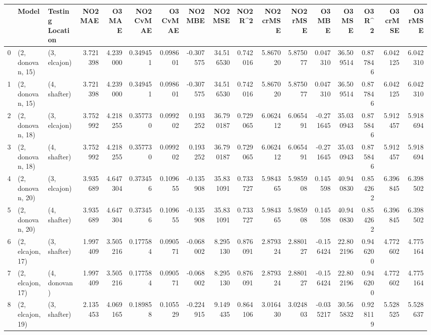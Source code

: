 \begin{tabular}{lllrrrrrrrrrrrrrr}
\toprule
{} &             Model & Testing Location &   NO2 MAE &    O3 MAE &  NO2 CvMAE &  O3 CvMAE &   NO2 MBE &    NO2 MSE &   NO2 R\textasciicircum2 &  NO2 crMSE &  NO2 rMSE &    O3 MBE &     O3 MSE &    O3 R\textasciicircum2 &  O3 crMSE &   O3 rMSE \\
\midrule
0  &  (2, donovan, 15) &     (3, elcajon) &  3.721398 &  4.239000 &   0.349451 &  0.098601 & -0.307575 &  34.516530 &  0.742016 &   5.867020 &  5.875077 &  0.047310 &  36.509514 &  0.877846 &  6.042125 &  6.042310 \\
1  &  (2, donovan, 15) &     (4, shafter) &  3.721398 &  4.239000 &   0.349451 &  0.098601 & -0.307575 &  34.516530 &  0.742016 &   5.867020 &  5.875077 &  0.047310 &  36.509514 &  0.877846 &  6.042125 &  6.042310 \\
2  &  (2, donovan, 18) &     (3, elcajon) &  3.752992 &  4.218255 &   0.357730 &  0.099202 &  0.193252 &  36.790187 &  0.729065 &   6.062412 &  6.065491 & -0.271645 &  35.030943 &  0.875846 &  5.912457 &  5.918694 \\
3  &  (2, donovan, 18) &     (4, shafter) &  3.752992 &  4.218255 &   0.357730 &  0.099202 &  0.193252 &  36.790187 &  0.729065 &   6.062412 &  6.065491 & -0.271645 &  35.030943 &  0.875846 &  5.912457 &  5.918694 \\
4  &  (2, donovan, 20) &     (3, elcajon) &  3.935689 &  4.647304 &   0.373456 &  0.109655 & -0.135908 &  35.831091 &  0.733727 &   5.984365 &  5.985908 &  0.145598 &  40.940830 &  0.854262 &  6.396845 &  6.398502 \\
5  &  (2, donovan, 20) &     (4, shafter) &  3.935689 &  4.647304 &   0.373456 &  0.109655 & -0.135908 &  35.831091 &  0.733727 &   5.984365 &  5.985908 &  0.145598 &  40.940830 &  0.854262 &  6.396845 &  6.398502 \\
6  &  (2, elcajon, 17) &     (3, shafter) &  1.997409 &  3.505216 &   0.177584 &  0.090571 & -0.068002 &   8.295130 &  0.876091 &   2.879324 &  2.880127 & -0.156424 &  22.802196 &  0.946200 &  4.772602 &  4.775164 \\
7  &  (2, elcajon, 17) &     (4, donovan) &  1.997409 &  3.505216 &   0.177584 &  0.090571 & -0.068002 &   8.295130 &  0.876091 &   2.879324 &  2.880127 & -0.156424 &  22.802196 &  0.946200 &  4.772602 &  4.775164 \\
8  &  (2, elcajon, 19) &     (3, shafter) &  2.135453 &  4.069165 &   0.189858 &  0.105529 & -0.224915 &   9.149435 &  0.864106 &   3.016430 &  3.024803 & -0.035217 &  30.565832 &  0.928119 &  5.528525 &  5.528637 \\

\end{tabular}
